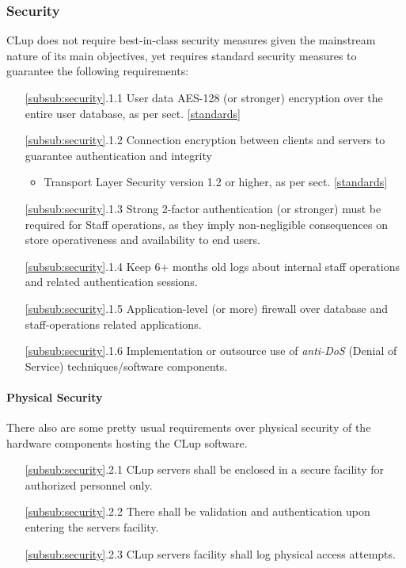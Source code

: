 \subsubsection{Security \label{subsub:security}}
CLup does not require best-in-class security measures given the mainstream nature of its main objectives, yet requires standard security measures to guarantee the following requirements:\newline
\begin{itemize}[leftmargin=+.8in]
    \item[\ref{subsub:security}.1.1] User data AES-128 (or stronger) encryption over the entire user database, as per sect. \ref{standards}
    \item[\ref{subsub:security}.1.2] Connection encryption between clients and servers to guarantee authentication and integrity 
    \begin{itemize}
        \item Transport Layer Security version 1.2 or higher, as per sect. \ref{standards}
    \end{itemize}
    \item[\ref{subsub:security}.1.3] Strong 2-factor authentication (or stronger) must be required for Staff operations, as they imply non-negligible consequences on store operativeness and availability to end users.
    \item[\ref{subsub:security}.1.4] Keep 6+ months old logs about internal staff operations and related authentication sessions.
    \item[\ref{subsub:security}.1.5] Application-level (or more) firewall over database and staff-operations related applications.
    \item[\ref{subsub:security}.1.6] Implementation or outsource use of \textit{anti-DoS} (Denial of Service) techniques/software components.
\end{itemize}
\paragraph{Physical Security}
There also are some pretty usual requirements over physical security of the hardware components hosting the CLup software.
\begin{itemize}[leftmargin=+.8in]
    \item[\ref{subsub:security}.2.1] CLup servers shall be enclosed in a secure facility for authorized personnel only.
    \item[\ref{subsub:security}.2.2] There shall be validation and authentication upon entering the servers facility.
    \item[\ref{subsub:security}.2.3] CLup servers facility shall log physical access attempts.
\end{itemize}

